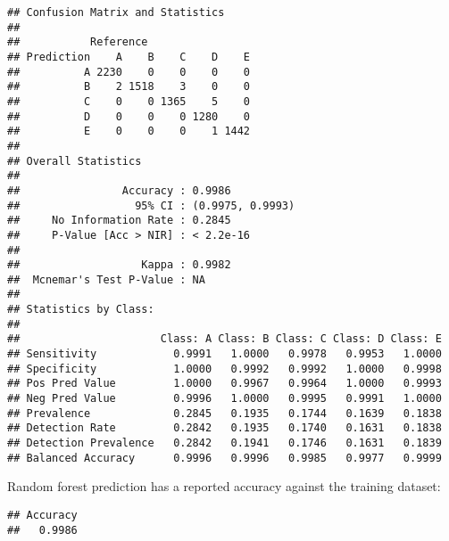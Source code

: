 \documentclass[]{article}
\newenvironment{Shaded}{\begin{snugshade}}{\end{snugshade}}
\newcommand{\KeywordTok}[1]{\textcolor[rgb]{0.13,0.29,0.53}{\textbf{{#1}}}}
\newcommand{\DataTypeTok}[1]{\textcolor[rgb]{0.13,0.29,0.53}{{#1}}}
\newcommand{\DecValTok}[1]{\textcolor[rgb]{0.00,0.00,0.81}{{#1}}}
\newcommand{\StringTok}[1]{\textcolor[rgb]{0.31,0.60,0.02}{{#1}}}
\newcommand{\NormalTok}[1]{{#1}}
\begin{document}
\begin{verbatim}
## Confusion Matrix and Statistics
## 
##           Reference
## Prediction    A    B    C    D    E
##          A 2230    0    0    0    0
##          B    2 1518    3    0    0
##          C    0    0 1365    5    0
##          D    0    0    0 1280    0
##          E    0    0    0    1 1442
## 
## Overall Statistics
##                                           
##                Accuracy : 0.9986          
##                  95% CI : (0.9975, 0.9993)
##     No Information Rate : 0.2845          
##     P-Value [Acc > NIR] : < 2.2e-16       
##                                           
##                   Kappa : 0.9982          
##  Mcnemar's Test P-Value : NA              
## 
## Statistics by Class:
## 
##                      Class: A Class: B Class: C Class: D Class: E
## Sensitivity            0.9991   1.0000   0.9978   0.9953   1.0000
## Specificity            1.0000   0.9992   0.9992   1.0000   0.9998
## Pos Pred Value         1.0000   0.9967   0.9964   1.0000   0.9993
## Neg Pred Value         0.9996   1.0000   0.9995   0.9991   1.0000
## Prevalence             0.2845   0.1935   0.1744   0.1639   0.1838
## Detection Rate         0.2842   0.1935   0.1740   0.1631   0.1838
## Detection Prevalence   0.2842   0.1941   0.1746   0.1631   0.1839
## Balanced Accuracy      0.9996   0.9996   0.9985   0.9977   0.9999
\end{verbatim}

Random forest prediction has a reported accuracy against the training
dataset:

\begin{Shaded}
\end{Shaded}

\begin{verbatim}
## Accuracy 
##   0.9986
\end{verbatim}

\begin{Shaded}
\end{Shaded}
\end{document}
